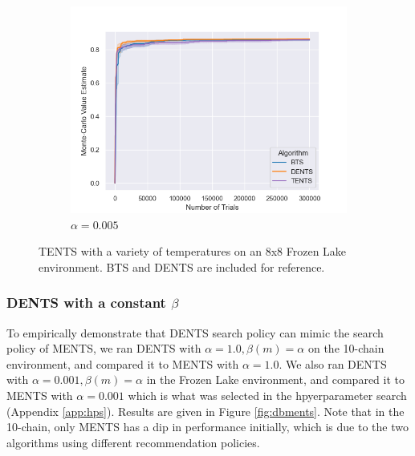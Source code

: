 \begin{figure}
\begin{subfigure}[b]{0.32\textwidth}
                    \centering
                    \includegraphics[width=\textwidth]{figures/temp/fl_sens/058_fl8_0_005_03.png}
                    \caption{$\alpha=0.005$}
                \end{subfigure}
                
                \caption{TENTS with a variety of temperatures on an 8x8 Frozen Lake environment. BTS and DENTS are included for reference. }
                \label{fig:fl_param_sens_tents}
            \end{figure}




        \subsubsection{DENTS with a constant $\beta$} \label{app:dents_mimic_ments}



            To empirically demonstrate that DENTS search policy can mimic the search policy of MENTS, we ran DENTS with $\alpha=1.0,\beta(m)=\alpha$ on the 10-chain environment, and compared it to MENTS with $\alpha=1.0$. We also ran DENTS with $\alpha=0.001, \beta(m)=\alpha$ in the Frozen Lake environment, and compared it to MENTS with $\alpha=0.001$ which is what was selected in the hpyerparameter search (Appendix \ref{app:hps}). Results are given in Figure \ref{fig:dbments}. Note that in the 10-chain, only MENTS has a dip in performance initially, which is due to the two algorithms using different recommendation policies.
            
